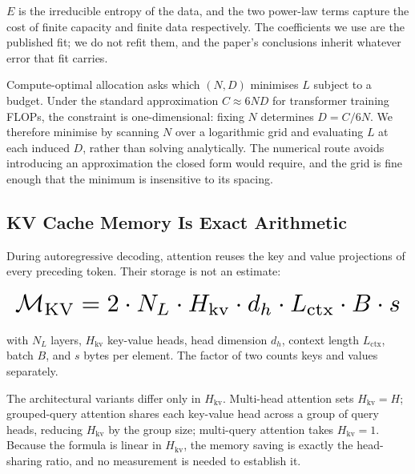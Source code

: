 \documentclass[11pt,a4paper]{article}
\begin{document}
$E$ is the irreducible entropy of the data, and the two power-law terms capture the cost of finite capacity and finite data respectively. The coefficients we use are the published fit; we do not refit them, and the paper's conclusions inherit whatever error that fit carries.

Compute-optimal allocation asks which $(N, D)$ minimises $L$ subject to a budget. Under the standard approximation $C \approx 6ND$ for transformer training FLOPs, the constraint is one-dimensional: fixing $N$ determines $D = C / 6N$. We therefore minimise by scanning $N$ over a logarithmic grid and evaluating $L$ at each induced $D$, rather than solving analytically. The numerical route avoids introducing an approximation the closed form would require, and the grid is fine enough that the minimum is insensitive to its spacing.


\subsection{KV Cache Memory Is Exact Arithmetic}


During autoregressive decoding, attention reuses the key and value projections of every preceding token. Their storage is not an estimate:










\begin{equation}
\resizebox{\columnwidth}{!}{$\displaystyle
\begin{aligned}
\mathcal{M}_{\text{KV}} = 2 \cdot N_L \cdot H_{\text{kv}} \cdot d_h \cdot L_{\text{ctx}} \cdot B \cdot s
\end{aligned}
$}
\end{equation}










with $N_L$ layers, $H_{\text{kv}}$ key-value heads, head dimension $d_h$, context length $L_{\text{ctx}}$, batch $B$, and $s$ bytes per element. The factor of two counts keys and values separately.

The architectural variants differ only in $H_{\text{kv}}$. Multi-head attention sets $H_{\text{kv}} = H$; grouped-query attention shares each key-value head across a group of query heads, reducing $H_{\text{kv}}$ by the group size; multi-query attention takes $H_{\text{kv}} = 1$. Because the formula is linear in $H_{\text{kv}}$, the memory saving is exactly the head-sharing ratio, and no measurement is needed to establish it.
\end{document}
